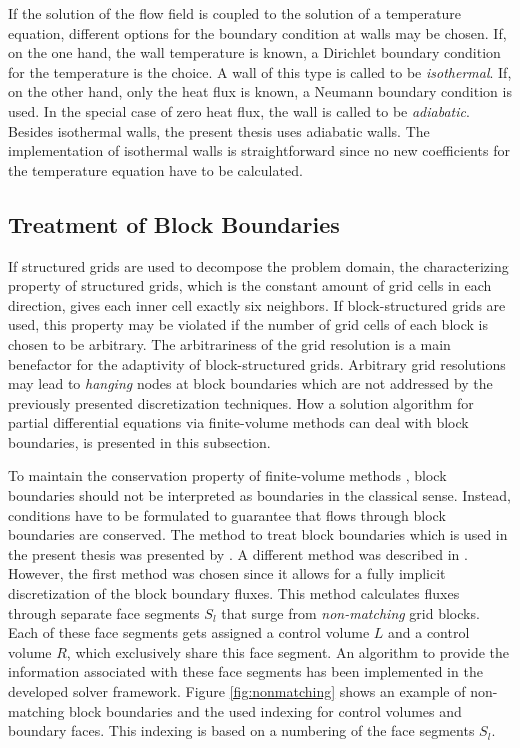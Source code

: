 If the solution of the flow field is coupled to the solution of a temperature equation, different options for the boundary condition at walls may be chosen. If, on the one hand, the wall temperature is known, a Dirichlet boundary condition for the temperature is the choice. A wall of this type is called to be \emph{isothermal}. If, on the other hand, only the heat flux is known, a Neumann boundary condition is used. In the special case of zero heat flux, the wall is called to be \emph{adiabatic}. Besides isothermal walls, the present thesis uses adiabatic walls. The implementation of isothermal walls is straightforward since no new coefficients for the temperature equation have to be calculated.

\subsection{Treatment of Block Boundaries}
\label{sec:blockboundaries}

If structured grids are used to decompose the problem domain, the characterizing property of structured grids, which is the constant amount of grid cells in each direction, gives each inner cell exactly six neighbors. If block-structured grids are used, this property may be violated if the number of grid cells of each block is chosen to be arbitrary. The arbitrariness of the grid resolution is a main benefactor for the adaptivity of block-structured grids. Arbitrary grid resolutions may lead to \emph{hanging} nodes at block boundaries which are not addressed by the previously presented discretization techniques. How a solution algorithm for partial differential equations via finite-volume methods can deal with block boundaries, is presented in this subsection.

To maintain the conservation property of finite-volume methods \cite{schaefer99}, block boundaries should not be interpreted as boundaries in the classical sense. Instead, conditions have to be formulated to guarantee that flows through block boundaries are conserved. The method to treat block boundaries which is used in the present thesis was presented by \cite{lilek97}. A different method was described in \cite{lange02}. However, the first method was chosen since it allows for a fully implicit discretization of the block boundary fluxes. This method calculates fluxes through separate face segments \(S_l\) that surge from \emph{non-matching} grid blocks. Each of these face segments gets assigned a control volume \(L\) and a control volume \(R\), which exclusively share this face segment. An algorithm to provide the information associated with these face segments has been implemented in the developed solver framework. Figure \ref{fig:nonmatching} shows an example of non-matching block boundaries and the used indexing for control volumes and boundary faces. This indexing is based on a numbering of the face segments \(S_l\).

